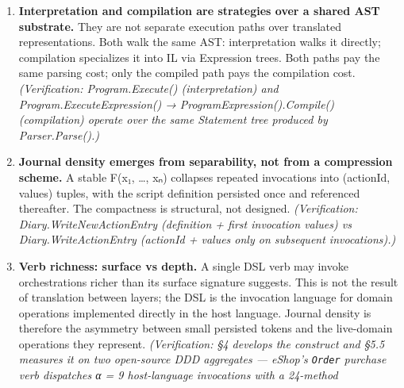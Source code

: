 \documentclass[
]{article}
\let\origtexttt\texttt%
\renewcommand{\texttt}[1]{\origtexttt{\seqsplit{#1}}}%
\let\texttt\origtexttt%
\begin{document}
\begin{enumerate}
  action entries in the journal, and economically compilable.
  \emph{Literal scripts} are non-separable: never cached, ephemeral, and
  persisted as their literal text. Whether either class is compiled or
  interpreted at runtime is governed by a separate per-actor policy
  that, by default, follows the parametric/literal split.
  \emph{(Verification: ActorHandler.cs:1091-1093 documents the rule
  verbatim. Implementation: PrepareCommandProgram
  (ActorHandler.cs:1097-1148) decides via parameters.HasUserParameter()
  and assigns one of three JournalEntry values --- IsScript (literal),
  IsNewAction (parametric, first invocation), IsExistingAction
  (parametric, cached invocation). Compilation flag set per program by
  AdjustCompilationMode (Program.cs:134-150) under the
  CompilationModePolicy enum.)}
\item
  \textbf{Interpretation and compilation are strategies over a shared
  AST substrate.} They are not separate execution paths over translated
  representations. Both walk the same AST: interpretation walks it
  directly; compilation specializes it into IL via Expression trees.
  Both paths pay the same parsing cost; only the compiled path pays the
  compilation cost. \emph{(Verification: Program.Execute()
  (interpretation) and Program.ExecuteExpression() →
  ProgramExpression().Compile() (compilation) operate over the same
  Statement tree produced by Parser.Parse().)}
\item
  \textbf{Journal density emerges from separability, not from a
  compression scheme.} A stable F(x₁, \ldots, xₙ) collapses repeated
  invocations into (actionId, values) tuples, with the script definition
  persisted once and referenced thereafter. The compactness is
  structural, not designed. \emph{(Verification:
  Diary.WriteNewActionEntry (definition + first invocation values) vs
  Diary.WriteActionEntry (actionId + values only on subsequent
  invocations).)}
\item
  \textbf{Verb richness: surface vs depth.} A single DSL verb may invoke
  orchestrations richer than its surface signature suggests. This is not
  the result of translation between layers; the DSL is the invocation
  language for domain operations implemented directly in the host
  language. Journal density is therefore the asymmetry between small
  persisted tokens and the live-domain operations they represent.
  \emph{(Verification: §4 develops the construct and §5.5 measures it on
  two open-source DDD aggregates --- eShop's \texttt{Order} purchase
  verb dispatches α = 9 host-language invocations with a 24-method
}
\end{enumerate}
\end{document}
